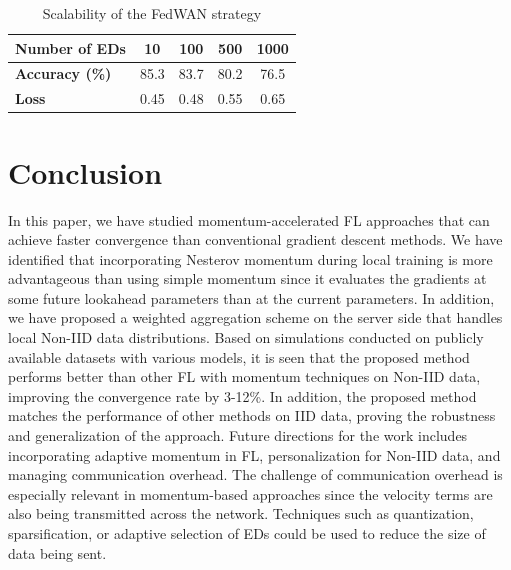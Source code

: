 \documentclass[journal]{IEEEtran}
\begin{document}
\begin{table}[!t]
\centering
\caption{Scalability of the FedWAN strategy}
\begin{tabular}{@{}lcccc@{}} %
\toprule
\textbf{Number of EDs} & \textbf{10} & \textbf{100} & \textbf{500} & \textbf{1000} \\ \midrule
\textbf{Accuracy (\%)} & 85.3 & 83.7 & 80.2 & 76.5 \\
\textbf{Loss} & 0.45 & 0.48 & 0.55 & 0.65 \\ 
\bottomrule
\end{tabular}
\label{tab:scalability}
\end{table}

\section{Conclusion}
In this paper, we have studied momentum-accelerated FL approaches that can achieve faster convergence than conventional gradient descent methods. We have identified that incorporating Nesterov momentum during local training is more advantageous than using simple momentum since it evaluates the gradients at some future lookahead parameters than at the current parameters. In addition, we have proposed a weighted aggregation scheme on the server side that handles local Non-IID data distributions. Based on simulations conducted on publicly available datasets with various models, it is seen that the proposed method performs better than other FL with momentum techniques on Non-IID data, improving the convergence rate by 3-12\%. In addition, the proposed method matches the performance of other methods on IID data, proving the robustness and generalization of the approach. Future directions for the work includes incorporating adaptive momentum in FL, personalization for Non-IID data, and managing communication overhead. The challenge of communication overhead is especially relevant in momentum-based approaches since the velocity terms are also being transmitted across the network. Techniques such as quantization, sparsification, or adaptive selection of EDs could be used to reduce the size of data being sent. 




\end{document}
